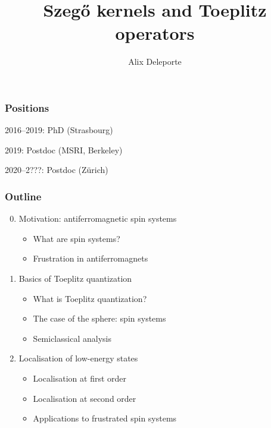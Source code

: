 \documentclass[mathserif]{beamer}
\title{Szeg\H{o} kernels and Toeplitz operators}
\author{Alix Deleporte}
\institute[UZH]{Institut für Mathematik\\Universität Zürich}
\begin{document}
\beamertemplatenavigationsymbolsempty

    \expandafter\def\expandafter\insertshorttitle\expandafter{%
       \insertshorttitle\hfill%
       }%


\begin{frame}
	\titlepage
      \end{frame}

      \begin{frame}
  \frametitle{Positions}
  2016--2019: PhD (Strasbourg)

  \vfill

  2019: Postdoc (MSRI, Berkeley)

  \vfill

  2020--2???: Postdoc (Zürich)
\end{frame}

      \begin{frame}
        \frametitle{Outline}
        \begin{enumerate}\setcounter{enumi}{-1}
        \item Motivation: antiferromagnetic spin systems
          \begin{itemize}
          \item What are spin systems?
          \item Frustration in antiferromagnets
          \end{itemize}
        \item Basics of Toeplitz quantization
          \begin{itemize}
          \item What is Toeplitz quantization?
          \item The case of the sphere: spin systems
          \item Semiclassical analysis
          \end{itemize}
        \item Localisation of low-energy states
          \begin{itemize}
          \item Localisation at first order
          \item Localisation at second order
          \item Applications to frustrated spin systems
          \end{itemize}
        \end{enumerate}
      \end{frame}
\end{document}
